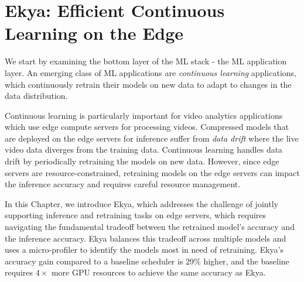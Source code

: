 \newcommand{\eg}{{\it e.g.,}\xspace}
\newcommand{\ie}{{\it i.e.,}\xspace}
\newcommand{\tbd}[1]{{\bf [[TBD: {#1}]]}}
\newcommand{\eat}[1]{}
\newcommand{\xref}[1]{\S\ref{#1}}
\newcommand{\name}{{Ekya}\xspace}
\newcommand{\fair}{uniform\xspace}
\newcommand{\Fair}{Uniform\xspace}
\newcommand{\myparashort}[1]{\vspace{0.07cm}\noindent{\bf {#1}}~}
\newcommand{\mypara}[1]{\vspace{0.07cm}\noindent{\bf {#1}:}~}
\newcommand{\myparaq}[1]{\vspace{0.07cm}\noindent{\bf {#1}?}~}

\chapter{Ekya: Efficient Continuous Learning on the Edge}
\label{ch_ekya}

We start by examining the bottom layer of the ML stack - the ML application layer. An emerging class of ML applications are {\em continuous learning} applications, which continuously retrain their models on new data to adapt to changes in the data distribution. 

Continuous learning is particularly important for video analytics applications which use edge compute servers for processing videos. 
Compressed models that are deployed on the edge servers for inference suffer from {\em data drift} where the live video data diverges from the training data. Continuous learning handles data drift by periodically retraining the models on new data. However, since edge servers are resource-constrained, retraining models on the edge servers can impact the inference accuracy and requires careful resource management.

In this Chapter, we introduce \name, which addresses the challenge of jointly supporting inference and retraining tasks on edge servers, which requires navigating the fundamental tradeoff between the retrained model's accuracy and the inference accuracy. 
\name balances this tradeoff across multiple models and uses a micro-profiler to identify the models most in need of retraining. {\name}'s accuracy gain compared to a baseline scheduler is $29\%$ higher, and the baseline requires $4\times$ more GPU resources to achieve the same accuracy as \name.











%
%
%
% 


%
% 
